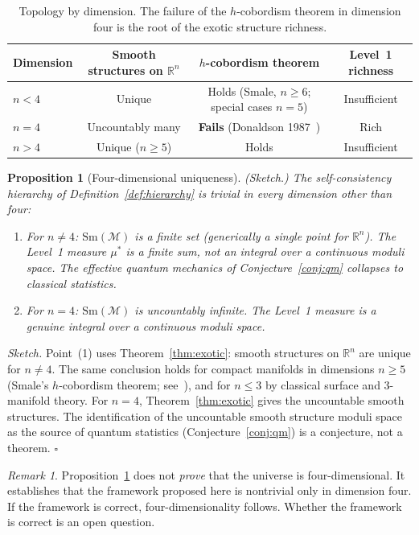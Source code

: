 \documentclass[12pt,a4paper]{article}
\newtheorem{proposition}{Proposition}
\theoremstyle{definition}
\theoremstyle{remark}
\newtheorem{remark}{Remark}
\begin{document}
\begin{table}[h]
\centering
\begin{tabular}{lccc}
\toprule
Dimension & Smooth structures on $\mathbb{R}^n$ & $h$-cobordism theorem & Level~1 richness \\
\midrule
$n < 4$ & Unique & Holds (Smale, $n \geq 6$; special cases $n = 5$) & Insufficient \\
$n = 4$ & Uncountably many & \textbf{Fails} (Donaldson 1987~\cite{donaldson_hcob}) & Rich \\
$n > 4$ & Unique ($n \geq 5$) & Holds & Insufficient \\
\bottomrule
\end{tabular}
\caption{Topology by dimension. The failure of the $h$-cobordism theorem in
dimension four is the root of the exotic structure richness.}
\label{tab:dimensions}
\end{table}

\begin{proposition}[Four-dimensional uniqueness]
\emph{(Sketch.)}
\label{prop:4d}
The self-consistency hierarchy of Definition~\ref{def:hierarchy} is trivial
in every dimension other than four:
\begin{enumerate}
\item For $n \neq 4$: $\mathrm{Sm}(\mathcal{M})$ is a finite set
(generically a single point for $\mathbb{R}^n$). The Level~1 measure
$\mu^*$ is a finite sum, not an integral over a continuous moduli space.
The effective quantum mechanics of Conjecture~\ref{conj:qm} collapses to
classical statistics.

\item For $n = 4$: $\mathrm{Sm}(\mathcal{M})$ is uncountably infinite.
The Level~1 measure is a genuine integral over a continuous moduli space.
\end{enumerate}
\end{proposition}

\noindent\emph{Sketch.} Point~(1) uses Theorem~\ref{thm:exotic}: smooth
structures on $\mathbb{R}^n$ are unique for $n \neq 4$. The same
conclusion holds for compact manifolds in dimensions $n \geq 5$ (Smale's
$h$-cobordism theorem; see~\cite{smale}), and for $n \leq 3$ by
classical surface and 3-manifold theory. For $n = 4$,
Theorem~\ref{thm:exotic} gives the uncountable smooth structures.
The identification of the uncountable smooth structure moduli space as
the source of quantum statistics (Conjecture~\ref{conj:qm}) is a
conjecture, not a theorem. \hfill$\square$

\begin{remark}
Proposition~\ref{prop:4d} does not \emph{prove} that the universe is
four-dimensional. It establishes that the framework proposed here is
nontrivial only in dimension four. If the framework is correct,
four-dimensionality follows. Whether the framework is correct is an open
question.
\end{remark}
\end{document}
